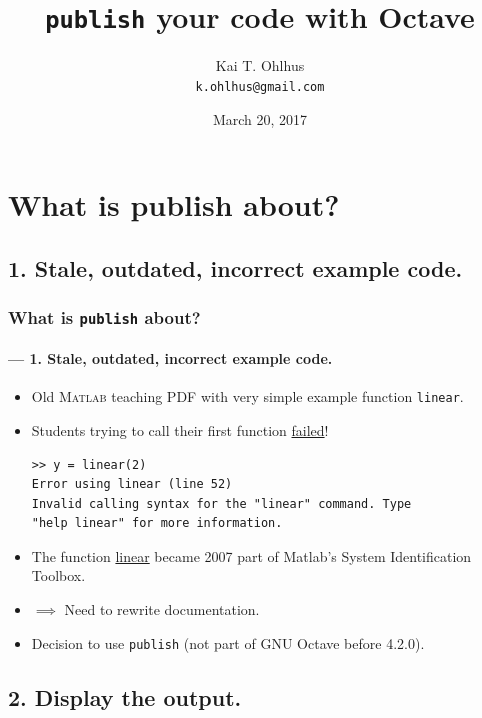 \documentclass[xcolor=svgnames]{beamer}
\title{\texttt{publish} your code with Octave}
\author[Ohlhus]{Kai T. Ohlhus \\ \texttt{k.ohlhus@gmail.com}}
\institute{OctConf 2017}
\date{March 20, 2017}
\begin{document}
\frame{\titlepage}



\section{What is publish about?}



\subsection{1. Stale, outdated, incorrect example code.}



\begin{frame}[fragile]
\frametitle{What is \texttt{publish} about?}
\framesubtitle<2>{--- 1. Stale, outdated, incorrect example code.}

\begin{itemize}
\item Old \textsc{Matlab} teaching PDF
  with very simple example function {\color{blue}\lstinline|linear|}.

\item Students trying to call their first function \underline{failed}!

\begin{lstlisting}[language={}]
>> y = linear(2)
Error using linear (line 52)
Invalid calling syntax for the "linear" command. Type
"help linear" for more information.
\end{lstlisting}

\item<2> The function \href{https://www.mathworks.com/help/ident/ref/linear.html}{linear}
became 2007 part of Matlab's System Identification Toolbox.
\item<2> $\implies$ Need to rewrite documentation.
\item<2> Decision to use \texttt{publish}
  (not part of GNU Octave before 4.2.0).
\end{itemize}
\end{frame}



\subsection{2. Display the output.}
\end{document}
